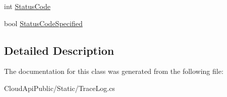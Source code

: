 \begin{DoxyCompactItemize}
\begin{DoxyCompactList}\small\item\em \end{DoxyCompactList}\item 
\hypertarget{class_cloud_api_public_1_1_static_1_1_communication_entry_aa7e5d3ad1a3e91f1b96a8daf22f7b9d0}{int \hyperlink{class_cloud_api_public_1_1_static_1_1_communication_entry_aa7e5d3ad1a3e91f1b96a8daf22f7b9d0}{Status\-Code}}\label{class_cloud_api_public_1_1_static_1_1_communication_entry_aa7e5d3ad1a3e91f1b96a8daf22f7b9d0}

\begin{DoxyCompactList}\small\item\em \end{DoxyCompactList}\item 
\hypertarget{class_cloud_api_public_1_1_static_1_1_communication_entry_a31e4dd2686e7c17008cfd875140ce6f4}{bool \hyperlink{class_cloud_api_public_1_1_static_1_1_communication_entry_a31e4dd2686e7c17008cfd875140ce6f4}{Status\-Code\-Specified}}\label{class_cloud_api_public_1_1_static_1_1_communication_entry_a31e4dd2686e7c17008cfd875140ce6f4}

\begin{DoxyCompactList}\small\item\em \end{DoxyCompactList}\end{DoxyCompactItemize}


\subsection{Detailed Description}


The documentation for this class was generated from the following file\-:\begin{DoxyCompactItemize}
\item 
Cloud\-Api\-Public/\-Static/Trace\-Log.\-cs\end{DoxyCompactItemize}
